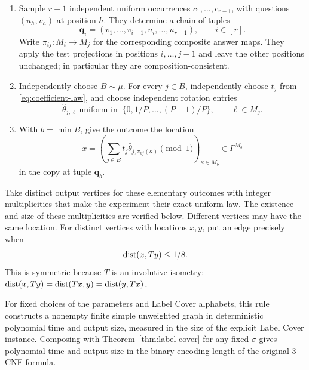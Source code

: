 \begin{enumerate}
\item Sample $r-1$ independent uniform occurrences
$c_1,\ldots,c_{r-1}$, with questions $(u_h,v_h)$ at position $h$.
They determine a chain of tuples
\[
 \mathbf q_i=(v_1,\ldots,v_{i-1},u_i,\ldots,u_{r-1}),
 \qquad i\in[r].
\]
Write $\pi_{ij}:M_i\to M_j$ for the corresponding composite answer maps.
They apply the test projections in positions $i,\ldots,j-1$
and leave the other positions unchanged; in particular they are
composition-consistent.

\item Independently choose $B\sim\mu$.
For every $j\in B$, independently choose $t_j$ from
\eqref{eq:coefficient-law}, and choose independent rotation entries
\[
 \widehat\theta_{j,\ell}\ \text{uniform in }\
 \{0,1/P,\ldots,(P-1)/P\},\qquad \ell\in M_j .
\]

\item With $b=\min B$, give the outcome the location
\begin{equation}\label{eq:location}
 x=\left(
 \sum_{j\in B}t_j\widehat\theta_{j,\pi_{bj}(\kappa)}
        \pmod1\right)_{\kappa\in M_b}
 \in\Gamma^{M_b}
\end{equation}
in the copy at tuple $\mathbf q_b$.
\end{enumerate}

Take distinct output vertices for these elementary outcomes with
integer multiplicities that make the experiment their exact uniform law.
The existence and size of these multiplicities are verified below.
Different vertices may have the same location.
For distinct vertices with locations $x,y$, put an edge precisely when
\begin{equation}\label{eq:edge}
 \operatorname{dist}(x,Ty)\le1/8.
\end{equation}
This is symmetric because $T$ is an involutive isometry:
$\operatorname{dist}(x,Ty)=\operatorname{dist}(Tx,y)=\operatorname{dist}(y,Tx)$.

\begin{proposition}\label{prop:encoding}
For fixed choices of the parameters and Label Cover alphabets, this rule
constructs a nonempty finite simple
unweighted graph in deterministic polynomial time and output size,
measured in the size of the explicit Label Cover instance. Composing
with Theorem~\ref{thm:label-cover} for any fixed $\sigma$ gives polynomial
time and output size in the binary encoding length of the original
$3$-CNF formula.
\end{proposition}

